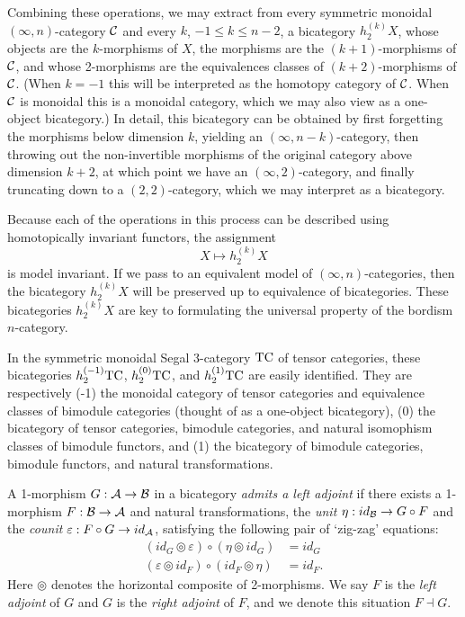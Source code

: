 \documentclass{amsart}
\begin{document}
Combining these operations, we may extract from every symmetric monoidal $(\infty,n)$-category $\mathcal C$ and every $k$,  $-1 \leq k \leq n-2$, a bicategory $h^{(k)}_2 X$, whose objects are the $k$-morphisms of $X$, the morphisms are the $(k+1)$-morphisms of $\mathcal C$, and whose 2-morphisms are the equivalences classes of $(k+2)$-morphisms of $\mathcal C$. (When $k=-1$ this will be interpreted as the homotopy category of $\mathcal C$. When $\mathcal C$ is monoidal this is a monoidal category, which we may also view as a one-object bicategory.)  In detail, this bicategory can be obtained by first forgetting the morphisms below dimension $k$, yielding an $(\infty,n-k)$-category, then throwing out the non-invertible morphisms of the original category above dimension $k+2$, at which point we have an $(\infty,2)$-category, and finally truncating down to a $(2,2)$-category, which we may interpret as a bicategory. 

Because each of the operations in this process can be described using homotopically invariant functors, the assignment
\begin{equation*}
	X \mapsto h^{(k)}_2 X
\end{equation*}
is model invariant. If we pass to an equivalent model of $(\infty,n)$-categories, then the bicategory  $h^{(k)}_2 X$ will be preserved up to equivalence of bicategories. These bicategories $h^{(k)}_2 X$ are key to formulating the universal property of the bordism $n$-category. 

\begin{example}
	In the symmetric monoidal Segal 3-category $\mathrm{TC}$ of tensor categories, these bicategories $h^{(-1)}_2 \mathrm{TC}$, $h^{(0)}_2 \mathrm{TC}$, and $h^{(1)}_2 \mathrm{TC}$ are easily identified. They are respectively (-1) the monoidal category of tensor categories and equivalence classes of bimodule categories (thought of as a one-object bicategory), (0) the bicategory of tensor categories, bimodule categories, and natural isomophism classes of bimodule functors, and (1) the bicategory of bimodule categories, bimodule functors, and natural transformations.
\end{example}

\begin{definition} \label{def:adjoints_in_bicat}
		A 1-morphism $G: \mathcal A \to \mathcal B$ in a bicategory {\em admits a left adjoint} if there exists a 1-morphism $F: \mathcal B \to \mathcal A$ and natural transformations, the {\em unit} $\eta: id_{\mathcal B} \to G \circ F$ and the {\em counit} $\varepsilon: F \circ G \to id_{\mathcal A}$, satisfying the following pair of `zig-zag' equations:
		\begin{align*}
			(id_{G} \circledcirc \varepsilon  ) \circ (  \eta \circledcirc id_{G}) &= id_{G} \\
			(\varepsilon \circledcirc id_{F}) \circ (id_{F} \circledcirc \eta) &= id_{F}.
		\end{align*}
	Here $\circledcirc$ denotes the horizontal composite of 2-morphisms.
	We say $F$ is the {\em left adjoint} of $G$ and $G$ is the {\em right adjoint} of $F$, and we denote this situation $F \dashv G$.
\end{definition}
\end{document}
